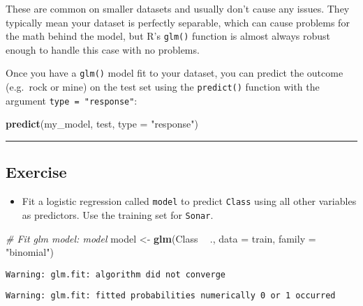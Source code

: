 \documentclass[]{book}
\newenvironment{Shaded}{\begin{snugshade}}{\end{snugshade}}
\newcommand{\KeywordTok}[1]{\textcolor[rgb]{0.13,0.29,0.53}{\textbf{#1}}}
\newcommand{\DataTypeTok}[1]{\textcolor[rgb]{0.13,0.29,0.53}{#1}}
\newcommand{\StringTok}[1]{\textcolor[rgb]{0.31,0.60,0.02}{#1}}
\newcommand{\CommentTok}[1]{\textcolor[rgb]{0.56,0.35,0.01}{\textit{#1}}}
\newcommand{\OperatorTok}[1]{\textcolor[rgb]{0.81,0.36,0.00}{\textbf{#1}}}
\newcommand{\NormalTok}[1]{#1}
\providecommand{\tightlist}{%
  \setlength{\itemsep}{0pt}\setlength{\parskip}{0pt}}
\begin{document}
These are common on smaller datasets and usually don't cause any issues.
They typically mean your dataset is perfectly separable, which can cause
problems for the math behind the model, but R's \texttt{glm()} function
is almost always robust enough to handle this case with no problems.

Once you have a \texttt{glm()} model fit to your dataset, you can
predict the outcome (e.g.~rock or mine) on the test set using the
\texttt{predict()} function with the argument
\texttt{type\ =\ "response"}:

\begin{Shaded}
\begin{Highlighting}[]
\KeywordTok{predict}\NormalTok{(my_model, test, }\DataTypeTok{type =} \StringTok{"response"}\NormalTok{)}
\end{Highlighting}
\end{Shaded}

\begin{center}\rule{0.5\linewidth}{\linethickness}\end{center}

\subsection*{Exercise}\label{exercise-10}

\begin{itemize}
\tightlist
\item
  Fit a logistic regression called \texttt{model} to predict
  \texttt{Class} using all other variables as predictors. Use the
  training set for \texttt{Sonar}.
\end{itemize}

\begin{Shaded}
\begin{Highlighting}[]
\CommentTok{# Fit glm model: model}
\NormalTok{model <-}\StringTok{ }\KeywordTok{glm}\NormalTok{(Class }\OperatorTok{~}\StringTok{ }\NormalTok{., }\DataTypeTok{data =}\NormalTok{ train, }\DataTypeTok{family =} \StringTok{"binomial"}\NormalTok{)}
\end{Highlighting}
\end{Shaded}

\begin{verbatim}
Warning: glm.fit: algorithm did not converge
\end{verbatim}

\begin{verbatim}
Warning: glm.fit: fitted probabilities numerically 0 or 1 occurred
\end{verbatim}
\end{document}
